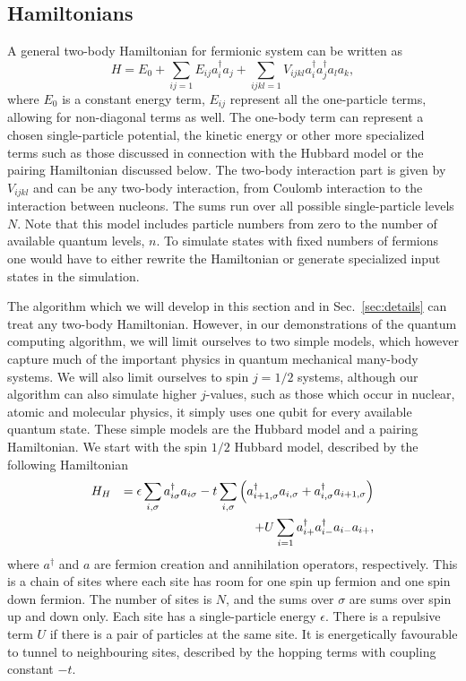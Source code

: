 \documentclass[aps,pra,twocolumn,floatfix]{revtex4}
\begin{document}
\subsection{Hamiltonians}
A general two-body Hamiltonian for fermionic system 
can be written as 
\begin{equation}
\label{eq:twobodyH}
H = E_0 + \sum_{ij=1} E_{ij} a^\dag_i a_j
+\sum_{ijkl = 1} V_{ijkl} a^\dag_i a^\dag_j a_l a_k,
\end{equation} 
where $E_0$ is a constant energy term, $E_{ij}$ represent all the
one-particle terms, allowing for non-diagonal terms as well. The
one-body term can represent 
a chosen single-particle potential, the kinetic energy or other more
specialized terms such as  
those discussed in connection with the Hubbard model
\cite{hubbardmodel} or the pairing Hamiltonian  
discussed below.
The two-body interaction part is given by $V_{ijkl}$ and can be any
two-body interaction, from 
Coulomb interaction to the interaction between nucleons.  
The sums run over all possible single-particle levels $N$. 
Note that
this model includes particle numbers from zero to the number of
available quantum levels, $n$. To simulate states with fixed numbers
of fermions one would have to either rewrite the Hamiltonian or
generate specialized input states in the simulation.

The algorithm which we will develop in this section and in
Sec.~\ref{sec:details} can treat any 
two-body Hamiltonian. However, 
in our demonstrations of the quantum computing algorithm, we will limit ourselves to
two simple models, which however capture much of the important physics
in quantum mechanical 
many-body systems. We will also limit ourselves to spin $j=1/2$
systems, although our algorithm 
can also simulate  higher $j$-values, such as those which occur in nuclear, atomic and
molecular physics, it simply uses one qubit for every available
quantum state.   
These simple models are the Hubbard model and a pairing
Hamiltonian.
We start with the spin $1/2$ Hubbard model, described by the following Hamiltonian
\begin{eqnarray}
H_H &&= \epsilon \sum_{i, \sigma} a_{i\sigma}^\dag a_{i\sigma} 
-t \sum_{i, \sigma} \left(a^\dag_{i+1, \sigma}a_{i, \sigma}
+a^\dag_{i, \sigma}a_{i+1, \sigma} \right) \notag \\
&& + U \sum_{i=1} a_{i+}^\dag a_{i-}^\dag a_{i-}a_{i+},
\label{eq:hubbard}
\end{eqnarray}
where $a^{\dagger}$ and $a$ are fermion creation and annihilation operators, respectively.
This is a chain of sites where each site has room for one spin up
fermion and one spin down fermion. 
The number of sites is $N$, and the sums over $\sigma$ are sums over
spin up and down only.
Each site has a single-particle
energy $\epsilon$. There is a repulsive term $U$ if there is a pair
of particles at the same site. It is energetically favourable to tunnel to
neighbouring sites, described by 
the hopping terms with coupling constant $-t$.
\end{document}
